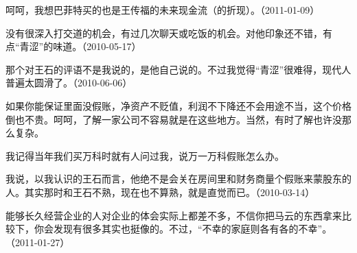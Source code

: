 
呵呵，我想巴菲特买的也是王传福的未来现金流（的折现）。（2011-01-09）



没有很深入打交道的机会，有过几次聊天或吃饭的机会。对他印象还不错，有点“青涩”的味道。（2010-05-17）

那个对王石的评语不是我说的，是他自己说的。不过我觉得“青涩”很难得，现代人普遍太圆滑了。（2010-06-06）


如果你能保证里面没假账，净资产不贬值，利润不下降还不会用途不当，这个价格倒也不贵。呵呵，了解一家公司不容易就是在这些地方。当然，有时了解也许没那么复杂。

我记得当年我们买万科时就有人问过我，说万一万科假账怎么办。

我说，以我认识的王石而言，他绝不是会关在房间里和财务商量个假账来蒙股东的人。其实那时和王石不熟，现在也不算熟，就是直觉而已。（2010-03-14）


能够长久经营企业的人对企业的体会实际上都差不多，不信你把马云的东西拿来比较下，你会发现有很多其实也挺像的。不过，“不幸的家庭则各有各的不幸”。（2011-01-27）
